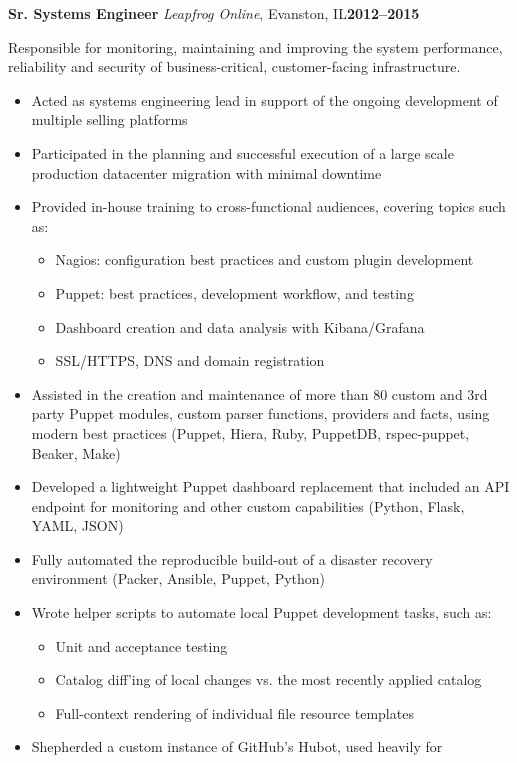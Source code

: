 \documentclass[11pt,letterpaper]{article}
\newcommand{\cventry}[5]{%
{\bfseries{#2}} {\small{\textit{#3}, #4}}\hfill {\small\bfseries{#1}}
\begin{adjustwidth}{1em}{2em}{\raggedright{#5}}\end{adjustwidth}
}
\begin{document}
\cventry{2012--2015}{Sr. Systems Engineer}{Leapfrog Online}{Evanston, IL}{%
{Responsible for monitoring, maintaining and improving the system performance,
reliability and security of business-critical, customer-facing infrastructure.}

\begin{small}
\begin{itemize}
\item Acted as systems engineering lead in support of the ongoing
      development of multiple selling platforms
\item Participated in the planning and successful execution of a large scale
      production datacenter migration with minimal downtime
\item Provided in-house training to cross-functional audiences, covering
      topics such as:
\begin{itemize}
  \item Nagios: configuration best practices and custom plugin development
  \item Puppet: best practices, development workflow, and testing
  \item Dashboard creation and data analysis with Kibana/Grafana
  \item SSL/HTTPS, DNS and domain registration
\end{itemize}
\item Assisted in the creation and maintenance of more than 80 custom and 3rd
      party Puppet modules, custom parser functions, providers and facts, using
      modern best practices (Puppet, Hiera, Ruby, PuppetDB, rspec-puppet,
      Beaker, Make)
\item Developed a lightweight Puppet dashboard replacement that included an
      API endpoint for monitoring and other custom capabilities (Python,
      Flask, YAML, JSON)
\item Fully automated the reproducible build-out of a disaster recovery
      environment (Packer, Ansible, Puppet, Python)
\item Wrote helper scripts to automate local Puppet development tasks, such as:
  \begin{itemize}
    \item Unit and acceptance testing
    \item Catalog diff'ing of local changes vs. the most recently applied catalog
    \item Full-context rendering of individual file resource templates
  \end{itemize}
\item Shepherded a custom instance of GitHub's Hubot, used heavily for

\end{itemize}
\end{small}}
\end{document}
